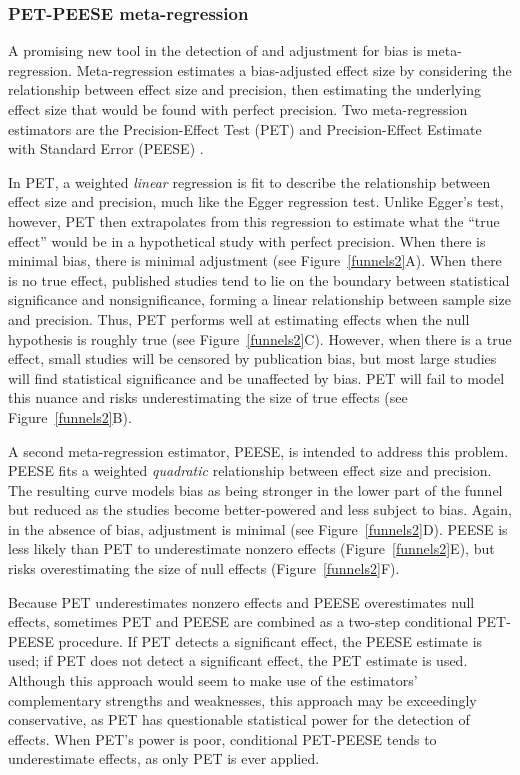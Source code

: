 \documentclass[man]{apa6}
\begin{document}
\subsubsection{PET-PEESE meta-regression}
A promising new tool in the detection of and adjustment for bias is meta-regression. Meta-regression estimates a bias-adjusted effect size by considering the relationship between effect size and precision, then estimating the underlying effect size that would be found with perfect precision. Two meta-regression estimators are the Precision-Effect Test (PET) and Precision-Effect Estimate with Standard Error (PEESE) \citep{Stanley:Doucouliagos:2013}. %

In PET, a weighted {\em linear} regression is fit to describe the relationship between effect size and precision, much like the Egger regression test. Unlike Egger's test, however, PET then extrapolates from this regression to estimate what the ``true effect'' would be in a hypothetical study with perfect precision. When there is minimal bias, there is minimal adjustment (see Figure~\ref{funnels2}A). When there is no true effect, published studies tend to lie on the boundary between statistical significance and nonsignificance, forming a linear relationship between sample size and precision. Thus, PET performs well at estimating effects when the null hypothesis is roughly true (see Figure~\ref{funnels2}C). However, when there is a true effect, small studies will be censored by publication bias, but most large studies will find statistical significance and be unaffected by bias. PET will fail to model this nuance and risks underestimating the size of true effects (see Figure~\ref{funnels2}B).

A second meta-regression estimator, PEESE, is intended to address this problem. PEESE fits a weighted {\em quadratic} relationship between effect size and precision. The resulting curve models bias as being stronger in the lower part of the funnel but reduced as the studies become better-powered and less subject to bias. Again, in the absence of bias, adjustment is minimal (see Figure~\ref{funnels2}D). PEESE is less likely than PET to underestimate nonzero effects (Figure~\ref{funnels2}E), but risks overestimating the size of null effects (Figure~\ref{funnels2}F).

Because PET underestimates nonzero effects and PEESE overestimates null effects, sometimes PET and PEESE are combined as a two-step conditional PET-PEESE procedure. If PET detects a significant effect, the PEESE estimate is used; if PET does not detect a significant effect, the PET estimate is used. Although this approach would seem to make use of the estimators' complementary strengths and weaknesses, this approach may be exceedingly conservative, as PET has questionable statistical power for the detection of effects. When PET's power is poor, conditional PET-PEESE tends to underestimate effects, as only PET is ever applied. 
\end{document}
